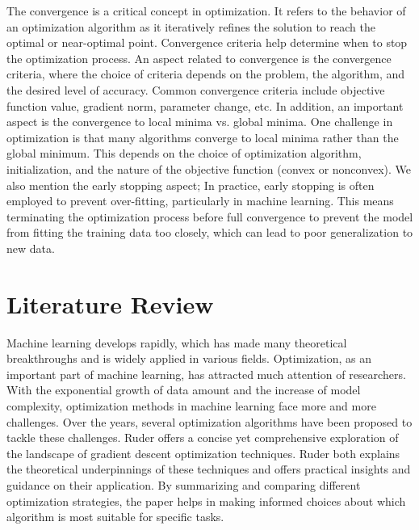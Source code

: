 \documentclass{article}
\begin{document}
The convergence is a critical concept in optimization. It refers to the behavior of an optimization algorithm as it iteratively refines the solution to reach the optimal or near-optimal point. Convergence criteria help determine when to stop the optimization process. An aspect related to convergence is the convergence criteria, where 
the choice of criteria depends on the problem, the algorithm, and the desired level of accuracy. Common convergence criteria include objective function value, gradient norm, parameter change, etc. In addition, an important aspect is the convergence to local minima vs. global minima. One challenge in optimization is that many algorithms converge to local minima rather than the global minimum. This depends on the choice of optimization algorithm, initialization, and the nature of the objective function (convex or nonconvex). We also mention the early stopping aspect; In practice, early stopping is often employed to prevent over-fitting, particularly in machine learning. This means terminating the optimization process before full convergence to prevent the model from fitting the training data too closely, which can lead to poor generalization to new data.
\section*{Literature Review}

Machine learning develops rapidly, which has made
many theoretical breakthroughs and is widely applied in various fields. Optimization, as an important part of machine learning,
has attracted much attention of researchers. With the exponential growth of data amount and the increase of model complexity, optimization methods in machine learning face more and more
challenges. Over the years, several optimization algorithms have been proposed to tackle these challenges. Ruder \cite{gdo} offers a concise yet comprehensive exploration of the landscape of gradient descent optimization techniques. Ruder both explains the theoretical underpinnings of these techniques and offers practical insights and guidance on their application. By summarizing and comparing different optimization strategies, the paper \cite{gdo} helps in making informed choices about which algorithm is most suitable for specific tasks.
\end{document}
